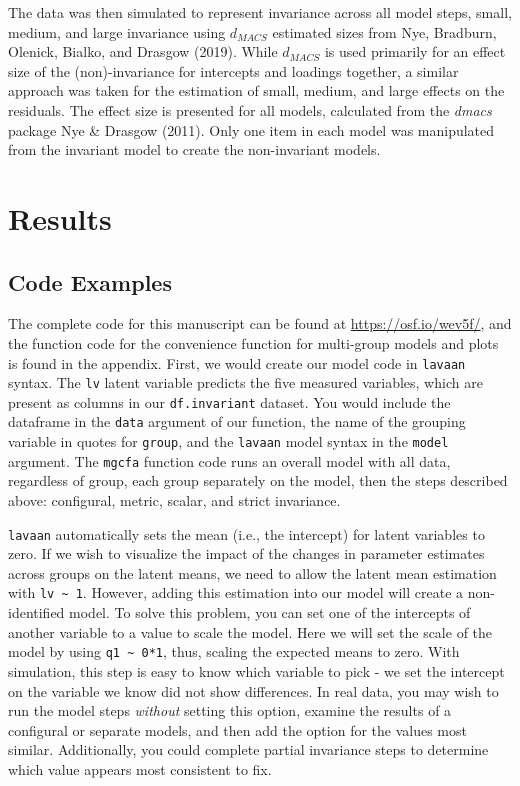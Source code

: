 \documentclass[
  man]{apa6}
\begin{document}
The data was then simulated to represent invariance across all model steps, small, medium, and large invariance using \(d_{MACS}\) estimated sizes from Nye, Bradburn, Olenick, Bialko, and Drasgow (2019). While \(d_{MACS}\) is used primarily for an effect size of the (non)-invariance for intercepts and loadings together, a similar approach was taken for the estimation of small, medium, and large effects on the residuals. The effect size is presented for all models, calculated from the \emph{dmacs} package Nye \& Drasgow (2011). Only one item in each model was manipulated from the invariant model to create the non-invariant models.

\hypertarget{results}{%
\section{Results}\label{results}}

\hypertarget{code-examples}{%
\subsection{Code Examples}\label{code-examples}}

The complete code for this manuscript can be found at \url{https://osf.io/wev5f/}, and the function code for the convenience function for multi-group models and plots is found in the appendix. First, we would create our model code in \texttt{lavaan} syntax. The \texttt{lv} latent variable predicts the five measured variables, which are present as columns in our \texttt{df.invariant} dataset. You would include the dataframe in the \texttt{data} argument of our function, the name of the grouping variable in quotes for \texttt{group}, and the \texttt{lavaan} model syntax in the \texttt{model} argument. The \texttt{mgcfa} function code runs an overall model with all data, regardless of group, each group separately on the model, then the steps described above: configural, metric, scalar, and strict invariance.

\texttt{lavaan} automatically sets the mean (i.e., the intercept) for latent variables to zero. If we wish to visualize the impact of the changes in parameter estimates across groups on the latent means, we need to allow the latent mean estimation with \texttt{lv\ \textasciitilde{}\ 1}. However, adding this estimation into our model will create a non-identified model. To solve this problem, you can set one of the intercepts of another variable to a value to scale the model. Here we will set the scale of the model by using \texttt{q1\ \textasciitilde{}\ 0*1}, thus, scaling the expected means to zero. With simulation, this step is easy to know which variable to pick - we set the intercept on the variable we know did not show differences. In real data, you may wish to run the model steps \emph{without} setting this option, examine the results of a configural or separate models, and then add the option for the values most similar. Additionally, you could complete partial invariance steps to determine which value appears most consistent to fix.
\end{document}
